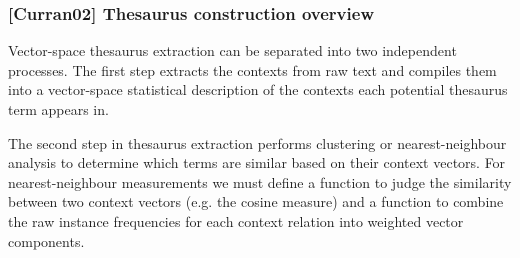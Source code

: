 \begin{frame}[plain]
	\frametitle{[Curran02] Thesaurus construction overview}
	\begin{block}{}
    Vector-space thesaurus extraction can be separated
    into two independent processes. The first step extracts 
    the contexts from raw text and compiles them into a 
    vector-space statistical description of the contexts 
    each potential thesaurus term appears in.
	\end{block} 
	\begin{block}{}
    The second step in thesaurus extraction performs
    clustering or nearest-neighbour analysis to determine which terms
    are similar based on their context 
    vectors. For nearest-neighbour measurements
    we must define a function to judge the similarity between two
    context vectors (e.g. the cosine measure) 
    and a function to combine the raw instance frequencies for each
    context relation into weighted vector 
    components.
	\end{block} 
\end{frame}
